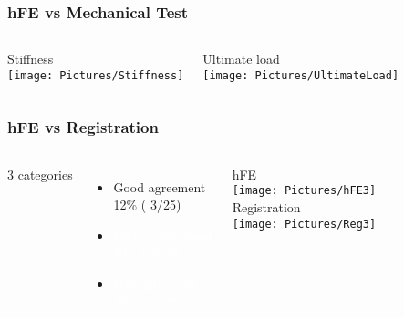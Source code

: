 \documentclass[xcolor=table,11pt]{beamer}
\begin{document}
	\begin{frame}
		\frametitle{hFE vs Mechanical Test}
		\centering
		\vfill
		\begin{columns}
			\centering
			Stiffness\\
			\texttt{[image: Pictures/Stiffness]}

			\centering
			Ultimate load\\
			\texttt{[image: Pictures/UltimateLoad]}
		\end{columns}
	\end{frame}

	\begin{frame}
		\frametitle{hFE vs Registration}
		\centering
		\vfill
		\begin{columns}
			\column{0.33\linewidth}
			\vfill
			3 categories\\
			\vfill
			\begin{itemize}
				\item Good agreement\\12\% ( 3/25)
				\item \textcolor{white}{Partial agreement\\40\% (10/25)}
				\item \textcolor{white}{Bad agreement\\48\% (12/25)}
			\end{itemize}
			\vfill
			\vspace{2.5mm}

			\column{0.4\linewidth}
			\centering
			hFE\\
			\texttt{[image: Pictures/hFE3]}\vspace{5mm}\\
			Registration\\
			\texttt{[image: Pictures/Reg3]}\\
			\vspace{2.5mm}

		\end{columns}
	\end{frame}
\end{document}
